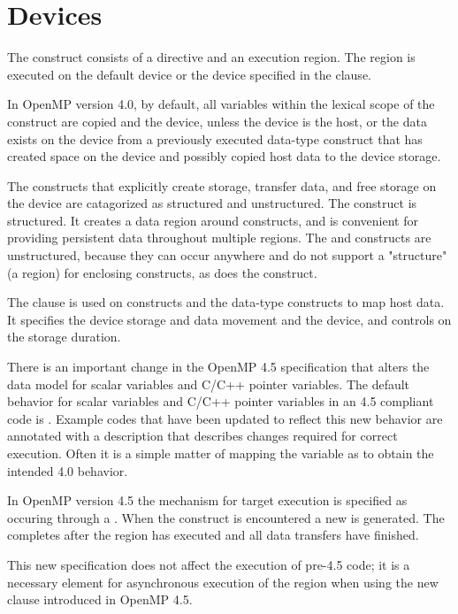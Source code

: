 \pagebreak
\chapter{Devices}
\label{chap:devices}

The  construct consists of a  directive 
and an execution region. The  region is executed on
the default device or the device specified in the  
clause. 

In OpenMP version 4.0, by default, all variables within the lexical
scope of the construct are copied  and  the
device, unless the device is the host, or the data exists on the
device from a previously executed data-type construct that
has created space on the device and possibly copied host
data to the device storage.

The constructs that explicitly
create storage, transfer data, and free storage on the device
are catagorized as structured and unstructured. The
  construct is structured. It creates
a data region around  constructs, and is
convenient for providing persistent data throughout multiple
 regions. The    and 
   constructs are unstructured, because 
they can occur anywhere and do not support a "structure" 
(a region) for enclosing  constructs, as does the
  construct. 

The  clause is used on  
constructs and the data-type constructs to map host data. It 
specifies the device storage and data movement  and 
the device, and controls on the storage duration.

There is an important change in the OpenMP 4.5 specification
that alters the data model for scalar variables and C/C++ pointer variables.
The default behavior for scalar variables and C/C++ pointer variables
in an 4.5 compliant code is . Example
codes that have been updated to reflect this new behavior are
annotated with a description that describes changes required
for correct execution. Often it is a simple matter of mapping
the variable as  to obtain the intended 4.0 behavior.

In OpenMP version 4.5 the mechanism for target
execution is specified as occuring through a . 
When the  construct is encountered a new 
 is generated. The  
completes after the  region has executed and all data 
transfers have finished.

This new specification does not affect the execution of 
pre-4.5 code; it is a necessary element for asynchronous 
execution of the  region when using the new  
clause introduced in OpenMP 4.5.
